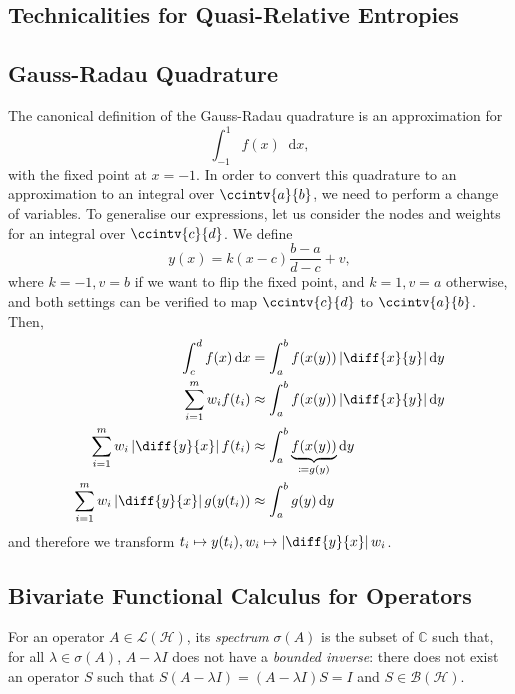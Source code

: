\documentclass[10pt, a4paper]{article}
\numberwithin{equation}{section} %
\theoremstyle{definition}
\theoremstyle{plain}
\newcommand{\abs}[1]{\left\lvert#1\right\rvert}
\newcommand{\dif}{\mathop{}\!\mathrm{d}} %
\newcommand{\?}{\mathrel{?}} %
\newcommand{\C}{\mathbb{C}} %
\newcommand{\Hs}{\mathcal{H}} %
\begin{document}
    \begin{appendices}
      \section{Technicalities for Quasi-Relative Entropies}\label{sec:qretech}

      \subsection{Gauss-Radau Quadrature}

      The canonical definition of the Gauss-Radau quadrature is an approximation for
      \[ \int_{-1}^{1} f(x) \dif{x}, \]
      with the fixed point at \(x = -1\). In order to convert this quadrature to an approximation to an integral over \(\ccintv{a}{b}\), we need to perform a change of variables. To generalise our expressions, let us consider the nodes and weights for an integral over \(\ccintv{c}{d}\). We define
      \[ y(x) = k(x - c)\frac{b - a}{d - c} + v, \]
      where \(k = -1, v = b\) if we want to flip the fixed point, and \(k = 1, v = a\) otherwise, and both settings can be verified to map \(\ccintv{c}{d}\) to \(\ccintv{a}{b}\). Then,
      \begin{align*}
        \int_{c}^{d} f(x) \dif{x} &= \int_{a}^{b} f(x(y)) \abs{\diff{x}{y}} \dif{y} \\
        \sum_{i=1}^m w_i f(t_i) &\approx \int_{a}^{b} f(x(y)) \abs{\diff{x}{y}} \dif{y} \\
        \sum_{i=1}^m w_i \abs{\diff{y}{x}} f(t_i) &\approx \int_{a}^{b} \underbrace{f(x(y))}_{\coloneqq g(y)} \dif{y} \\
        \sum_{i=1}^m w_i \abs{\diff{y}{x}} g(y(t_i)) &\approx \int_{a}^{b} g(y) \dif{y}
      \end{align*}
      and therefore we transform \(t_i \mapsto y(t_i), w_i \mapsto \abs{\diff{y}{x}} w_i\).

      \subsection{Bivariate Functional Calculus for Operators}

      For an operator \(A \in \mathcal{L}(\Hs)\), its \emph{spectrum} \(\sigma(A)\) is the subset of \(\C\) such that, for all \(\lambda \in \sigma(A)\), \(A - \lambda I\) does not have a \emph{bounded inverse}: there does not exist an operator \(S\) such that \(S\left( A - \lambda I \right) = \left( A - \lambda I \right)S =  I\) and \(S \in \mathcal{B}(\Hs)\).


\end{appendices}
\end{document}
